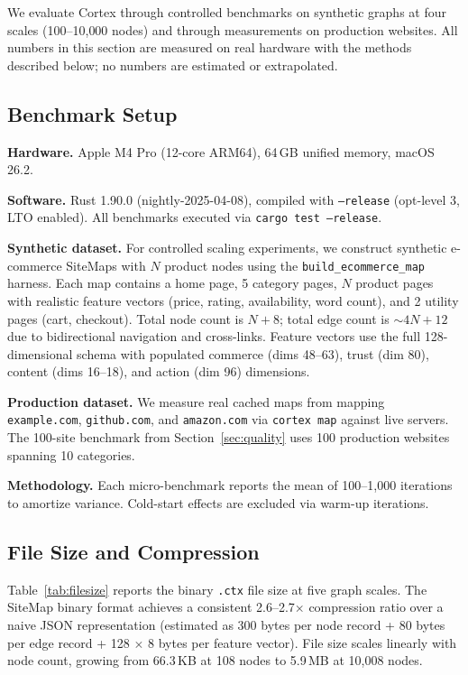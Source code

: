 \documentclass[10pt, twocolumn]{article}
\begin{document}
We evaluate Cortex through controlled benchmarks on synthetic graphs at four scales (100--10{,}000 nodes) and through measurements on production websites. All numbers in this section are measured on real hardware with the methods described below; no numbers are estimated or extrapolated.

\subsection{Benchmark Setup}
\label{sec:setup}

\textbf{Hardware.} Apple M4 Pro (12-core ARM64), 64\,GB unified memory, macOS 26.2.

\textbf{Software.} Rust 1.90.0 (nightly-2025-04-08), compiled with \texttt{--release} (opt-level 3, LTO enabled). All benchmarks executed via \texttt{cargo test --release}.

\textbf{Synthetic dataset.} For controlled scaling experiments, we construct synthetic e-commerce SiteMaps with $N$ product nodes using the \texttt{build\_ecommerce\_map} harness. Each map contains a home page, 5 category pages, $N$ product pages with realistic feature vectors (price, rating, availability, word count), and 2 utility pages (cart, checkout). Total node count is $N + 8$; total edge count is $\sim 4N + 12$ due to bidirectional navigation and cross-links. Feature vectors use the full 128-dimensional schema with populated commerce (dims 48--63), trust (dim 80), content (dims 16--18), and action (dim 96) dimensions.

\textbf{Production dataset.} We measure real cached maps from mapping \texttt{example.com}, \texttt{github.com}, and \texttt{amazon.com} via \texttt{cortex map} against live servers. The 100-site benchmark from Section~\ref{sec:quality} uses 100 production websites spanning 10 categories.

\textbf{Methodology.} Each micro-benchmark reports the mean of 100--1{,}000 iterations to amortize variance. Cold-start effects are excluded via warm-up iterations.

\subsection{File Size and Compression}
\label{sec:filesize}

Table~\ref{tab:filesize} reports the binary \texttt{.ctx} file size at five graph scales. The SiteMap binary format achieves a consistent 2.6--2.7$\times$ compression ratio over a naive JSON representation (estimated as 300 bytes per node record + 80 bytes per edge record + 128 $\times$ 8 bytes per feature vector). File size scales linearly with node count, growing from 66.3\,KB at 108 nodes to 5.9\,MB at 10{,}008 nodes.
\end{document}
